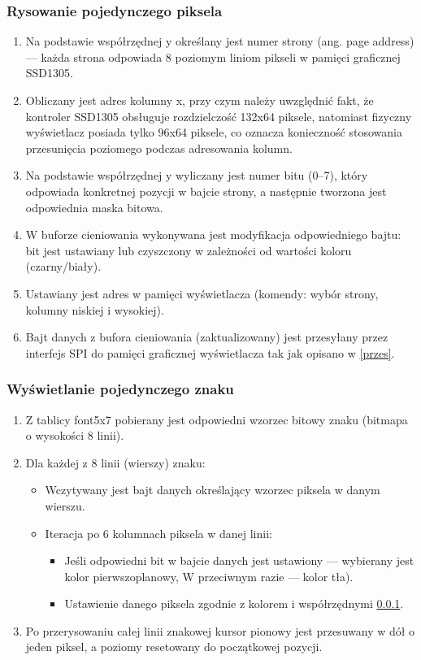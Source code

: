 \subsubsection {Rysowanie pojedynczego piksela}
\label{piksel}
\begin{enumerate}
    \item Na podstawie współrzędnej y określany jest numer strony (ang. page address) — każda strona odpowiada 8 poziomym liniom pikseli w pamięci graficznej SSD1305.
    \item Obliczany jest adres kolumny x, przy czym należy uwzględnić fakt, że kontroler SSD1305 obsługuje rozdzielczość 132x64 piksele, natomiast fizyczny wyświetlacz posiada tylko 96x64 piksele, co oznacza konieczność stosowania przesunięcia poziomego podczas adresowania kolumn.
    \item Na podstawie współrzędnej y wyliczany jest numer bitu (0–7), który odpowiada konkretnej pozycji w bajcie strony, a następnie tworzona jest odpowiednia maska bitowa.
    \item W buforze cieniowania wykonywana jest modyfikacja odpowiedniego bajtu: bit jest ustawiany lub czyszczony w zależności od wartości koloru (czarny/biały).
    \item Ustawiany jest adres w pamięci wyświetlacza (komendy: wybór strony, kolumny niskiej i wysokiej).
    \item Bajt danych z bufora cieniowania (zaktualizowany) jest przesyłany przez interfejs SPI do pamięci graficznej wyświetlacza tak jak opisano w \ref{przes}.
\end{enumerate}

\subsubsection{Wyświetlanie pojedynczego znaku}
\begin{enumerate}
    \item Z tablicy font5x7 pobierany jest odpowiedni wzorzec bitowy znaku (bitmapa o wysokości 8 linii).
    \item Dla każdej z 8 linii (wierszy) znaku:
    \begin{itemize}
        \item Wczytywany jest bajt danych określający wzorzec piksela w danym wierszu.
        \item Iteracja po 6 kolumnach piksela w danej linii:
        \begin{itemize}
            \item Jeśli odpowiedni bit w bajcie danych jest ustawiony — wybierany jest kolor pierwszoplanowy, W przeciwnym razie — kolor tła).
            \item Ustawienie danego piksela zgodnie z kolorem i współrzędnymi \ref{piksel}.
        \end{itemize}
    \end{itemize}
    \item Po przerysowaniu całej linii znakowej kursor pionowy jest przesuwany w dół o jeden piksel, a poziomy resetowany do początkowej pozycji.
\end{enumerate}

